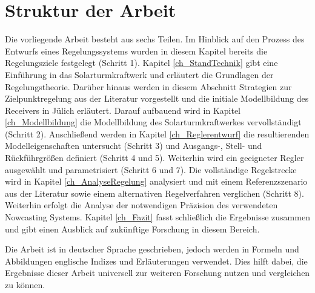 \section{Struktur der Arbeit} \label{sec_Struktur}
Die vorliegende Arbeit besteht aus sechs Teilen.
Im Hinblick auf den Prozess des Entwurfs eines Regelungssystems wurden in diesem Kapitel bereits die Regelungsziele festgelegt (Schritt 1).
Kapitel \ref{ch_StandTechnik} gibt eine Einführung in das Solarturmkraftwerk und erläutert die Grundlagen der Regelungstheorie.
Darüber hinaus werden in diesem Abschnitt Strategien zur Zielpunktregelung aus der Literatur vorgestellt und die initiale Modellbildung des Receivers in Jülich erläutert.
Darauf aufbauend wird in Kapitel \ref{ch_Modellbildung} die Modellbildung des Solarturmkraftwerkes vervollständigt (Schritt 2).
Anschließend werden in Kapitel \ref{ch_Reglerentwurf} die resultierenden Modelleigenschaften untersucht (Schritt 3) und Ausgangs-, Stell- und Rückführgrößen definiert (Schritt 4 und 5).
Weiterhin wird ein geeigneter Regler ausgewählt und parametrisiert (Schritt 6 und 7).
Die vollständige Regelstrecke wird in Kapitel \ref{ch_AnalyseRegelung} analysiert und mit einem Referenzszenario aus der Literatur sowie einem alternativen Regelverfahren verglichen (Schritt 8).
Weiterhin erfolgt die Analyse der notwendigen Präzision des verwendeten Nowcasting Systems.
Kapitel \ref{ch_Fazit} fasst schließlich die Ergebnisse zusammen und gibt einen Ausblick auf zukünftige Forschung in diesem Bereich.

Die Arbeit ist in deutscher Sprache geschrieben, jedoch werden in Formeln und Abbildungen englische Indizes und Erläuterungen verwendet.
Dies hilft dabei, die Ergebnisse dieser Arbeit universell zur weiteren Forschung nutzen und vergleichen zu können.


